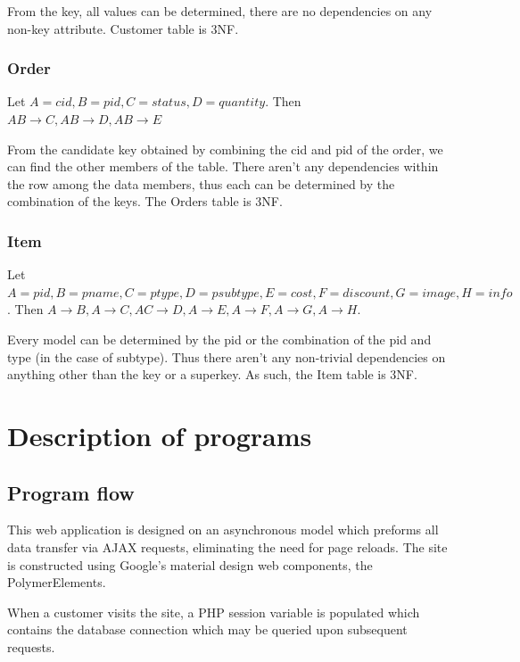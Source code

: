 \documentclass[letterpaper]{article}
\begin{document}
From the key, all values can be determined, there are no dependencies on any non-key attribute.  Customer table is 3NF.

\subsubsection{Order}
Let $A=cid, B=pid, C=status, D=quantity$. Then $AB \rightarrow C, AB \rightarrow D, AB \rightarrow E$	

From the candidate key obtained by combining the cid and pid of the order, we can find the other members of the table.  There aren’t any dependencies within the row among the data members, thus each can be determined by the combination of the keys.  The Orders table is 3NF.



\subsubsection{Item}

Let $A=pid, B=pname, C=ptype, D=psubtype, E=cost, F=discount, G=image, H=info$. Then $A \rightarrow B, A \rightarrow C, AC \rightarrow D,  A \rightarrow E,  A \rightarrow F, A \rightarrow G, A \rightarrow H$.

Every model can be determined by the pid or the combination of the pid and type (in the case of subtype).  Thus there aren’t any non-trivial dependencies on anything other than the key or a superkey.  As such, the Item table is 3NF.




\section{Description of programs}
\subsection{Program flow}

This web application is designed on an asynchronous model which preforms all data transfer via AJAX requests, eliminating the need for page reloads. The site is constructed using Google's material design web components, the PolymerElements.\cite{polymer} 

When a customer visits the site, a PHP session variable is populated which contains the database connection which may be queried upon subsequent requests. 
\end{document}
